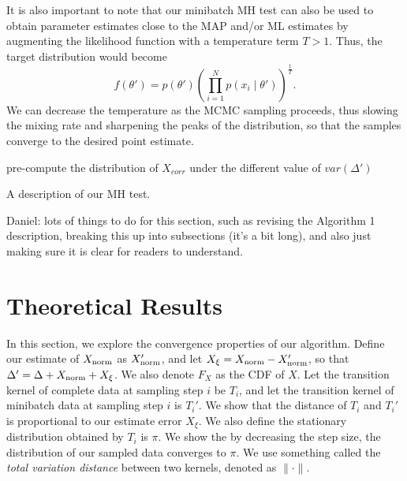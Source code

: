 \documentclass{article}
\begin{document}
It is also important to note that our minibatch MH test can also be used to obtain parameter
estimates close to the MAP and/or ML estimates by augmenting the likelihood function with a
temperature term $T > 1$. Thus, the target distribution would become
\begin{equation}
\label{eq:temperature} f(\theta') = p(\theta')\left ( \prod_{i=1}^N p(x_i \mid \theta')\right)^{\frac{1}{T}}.
\end{equation}
We can decrease the temperature as the MCMC sampling proceeds, thus slowing the mixing rate and
sharpening the peaks of the distribution, so that the samples converge to the desired point estimate.

\begin{algorithm}[t]
pre-compute the distribution of $X_{corr}$ under the different value of $var(\Delta')$\;
\caption{A description of our MH test.}
\label{alg:our_algorithm}
\end{algorithm}

{\color{blue}
Daniel: lots of things to do for this section, such as revising the Algorithm 1 description,
breaking this up into subsections (it's a bit long), and also just making sure it is clear for
readers to understand.
}




\section{Theoretical Results}\label{sec:theory}

In this section, we explore the convergence properties of our algorithm.  Define our estimate of
$X_{\rm norm}$ as $X_{\rm norm}'$, and let $X_{\xi} = X_{\rm norm} - X_{\rm norm}'$, so that
$\Delta' = \Delta + X_{\rm norm} + X_\xi$.  We also denote $F_X$ as the CDF of $X$.  Let the
transition kernel of complete data at sampling step $i$ be $T_i$, and let the transition kernel of
minibatch data at sampling step $i$ is $T_i'$.  We show that the distance of $T_i$ and $T_i'$ is
proportional to our estimate error $X_{\xi}$. We also define the stationary distribution obtained
by $T_i$ is $\pi$.  We show the by decreasing the step size, the distribution of our sampled data
converges to $\pi$. We use something called the \emph{total variation distance} between two kernels,
denoted as $\| \cdot \|$.
\end{document}
